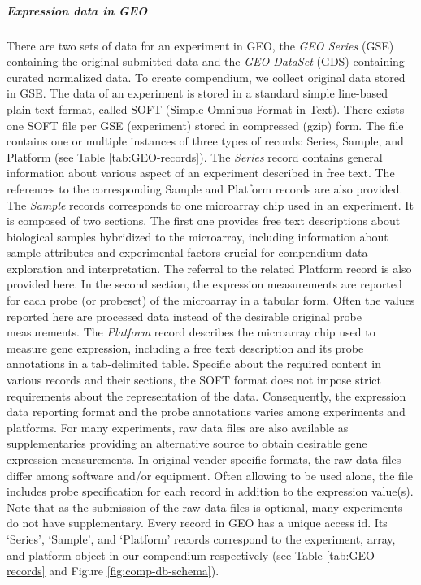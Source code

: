 \subparagraph{Expression data in GEO} There are two sets of data for an experiment in GEO, the \textit{GEO Series} (GSE) containing the original submitted data and the \textit{GEO DataSet} (GDS) containing curated normalized data. To create compendium, we collect original data stored in GSE. The data of an experiment is stored in a standard simple line-based plain text format, called SOFT (Simple Omnibus Format in Text).  There exists one SOFT file per GSE (experiment) stored in compressed (gzip) form. The file contains one or multiple instances of three types of records: Series, Sample, and Platform (see Table \ref{tab:GEO-records}). The \textit{Series} record contains general information about various aspect of an experiment described in free text.  The references to the corresponding Sample and Platform records are also provided. The \textit{Sample} records corresponds to one microarray chip used in an experiment. It is composed of two sections.  The first one provides free text descriptions about biological samples hybridized to the microarray, including information about sample attributes and experimental factors crucial for compendium data exploration and interpretation. The referral to the related Platform record is also provided here. In the second section, the expression measurements are reported for each probe (or probeset) of the microarray in a tabular form. Often the values reported here are processed data instead of the desirable original probe measurements. The \textit{Platform} record describes the microarray chip used to measure gene expression, including a free text description and its probe annotations in a tab-delimited table. Specific about the required content in various records and their sections, the SOFT format does not impose strict requirements about the representation of the data. Consequently, the expression data reporting format and the probe annotations varies among experiments and platforms. For many experiments, raw data files are also available as supplementaries providing an alternative source to obtain desirable gene expression measurements. In original vender specific formats, the raw data files differ among software and/or equipment.  Often allowing to be used alone, the file includes probe specification for each record in addition to the expression value(s). Note that as the submission of the raw data files is optional, many experiments do not have supplementary. Every record in GEO has a unique access id. Its `Series', `Sample', and `Platform' records correspond to the experiment, array, and platform object in our compendium respectively (see Table \ref{tab:GEO-records} and Figure \ref{fig:comp-db-schema}). 

